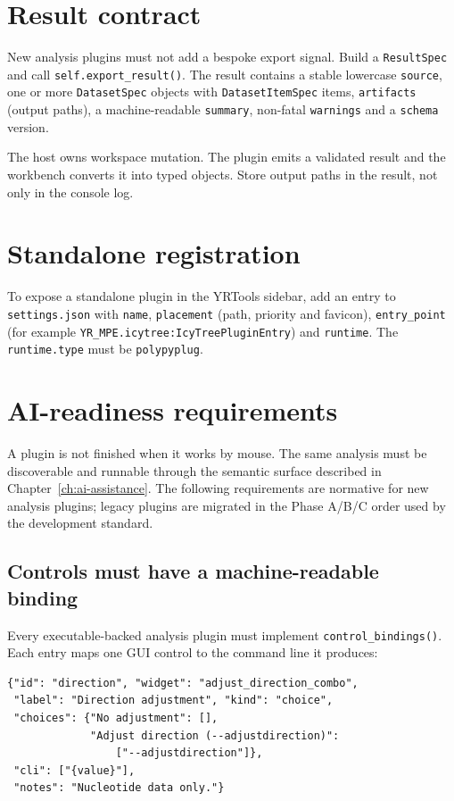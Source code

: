 \documentclass[10pt]{report}
\begin{document}
\section{Result contract}

New analysis plugins must not add a bespoke export signal. Build a
\texttt{ResultSpec} and call \texttt{self.export\_result()}. The result contains
a stable lowercase \texttt{source}, one or more \texttt{DatasetSpec} objects
with \texttt{DatasetItemSpec} items, \texttt{artifacts} (output paths), a
machine-readable \texttt{summary}, non-fatal \texttt{warnings} and a
\texttt{schema} version.

The host owns workspace mutation. The plugin emits a validated result and the
workbench converts it into typed objects. Store output paths in the result, not
only in the console log.

\section{Standalone registration}

To expose a standalone plugin in the YRTools sidebar, add an entry to
\texttt{settings.json} with \texttt{name}, \texttt{placement} (path, priority
and favicon), \texttt{entry\_point} (for example
\texttt{YR\_MPE.icytree:IcyTreePluginEntry}) and \texttt{runtime}. The
\texttt{runtime.type} must be \texttt{polypyplug}.

\section{AI-readiness requirements}

A plugin is not finished when it works by mouse. The same analysis must be
discoverable and runnable through the semantic surface described in
Chapter~\ref{ch:ai-assistance}. The following requirements are normative for
new analysis plugins; legacy plugins are migrated in the Phase A/B/C order
used by the development standard.

\subsection{Controls must have a machine-readable binding}

Every executable-backed analysis plugin must implement
\texttt{control\_bindings()}. Each entry maps one GUI control to the command
line it produces:

\begin{lstlisting}[basicstyle=\ttfamily\small,frame=single]
{"id": "direction", "widget": "adjust_direction_combo",
 "label": "Direction adjustment", "kind": "choice",
 "choices": {"No adjustment": [],
             "Adjust direction (--adjustdirection)":
                 ["--adjustdirection"]},
 "cli": ["{value}"],
 "notes": "Nucleotide data only."}
\end{lstlisting}
\end{document}
